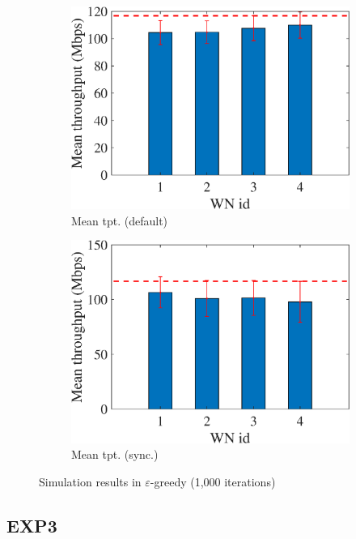 \documentclass[preprint,12pt]{article}
\begin{document}
\begin{figure}[h!]
\begin{subfigure}[b]{.3\textwidth}
		\includegraphics[width=\textwidth]{images/mean_tpt_EG}
		\caption{Mean tpt. (default)}\label{fig:mean_tpt_EG}
	\end{subfigure}
	\begin{subfigure}[b]{.3\textwidth}
		\includegraphics[width=\textwidth]{images/mean_tpt_CEG}
		\caption{Mean tpt. (sync.)}\label{fig:mean_tpt_CEG}
	\end{subfigure}
	\caption{Simulation results in $\varepsilon$-greedy (1,000 iterations)}
	\label{fig:e_greedy}
\end{figure}

\subsection{EXP3}
\label{section:exp3}
\end{document}
